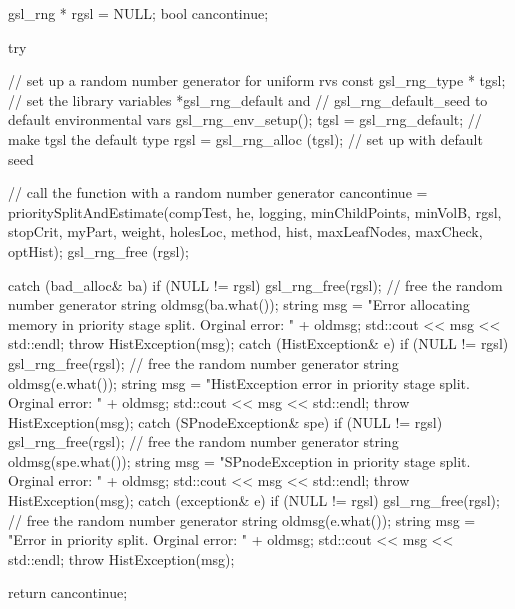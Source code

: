 \begin{DoxyCode}
{
    gsl_rng * rgsl = NULL;
    bool cancontinue;

    try {
        // set up a random number generator for uniform rvs
        const gsl_rng_type * tgsl;
        // set the library variables *gsl_rng_default and
        // gsl_rng_default_seed to default environmental vars
        gsl_rng_env_setup();
        tgsl = gsl_rng_default; // make tgsl the default type
        rgsl = gsl_rng_alloc (tgsl); // set up with default seed

        // call the function with a random number generator
        cancontinue = prioritySplitAndEstimate(compTest, he, logging, 
      minChildPoints, 
                        minVolB, rgsl, stopCrit, myPart, weight, holesLoc,
                        method, hist,
                        maxLeafNodes, maxCheck, optHist);
        gsl_rng_free (rgsl);
    }

    catch (bad_alloc& ba) {
        if (NULL != rgsl) gsl_rng_free(rgsl); // free the random number
       generator
        string oldmsg(ba.what());
        string msg = "Error allocating memory in priority stage split.  Orginal
       error: "
                                     + oldmsg;
        std::cout << msg << std::endl;
        throw HistException(msg);
    }
    catch (HistException& e) {
        if (NULL != rgsl) gsl_rng_free(rgsl); // free the random number
       generator
        string oldmsg(e.what());
        string msg = "HistException error in priority stage split.  Orginal
       error: "
                                    + oldmsg;
        std::cout << msg << std::endl;
        throw HistException(msg);
    }
    catch (SPnodeException& spe) {
        if (NULL != rgsl) gsl_rng_free(rgsl); // free the random number
       generator
        string oldmsg(spe.what());
        string msg = "SPnodeException in priority stage split.  Orginal error: 
      "
                                    + oldmsg;
        std::cout << msg << std::endl;
        throw HistException(msg);
    }
    catch (exception& e) {
        if (NULL != rgsl) gsl_rng_free(rgsl); // free the random number
       generator
        string oldmsg(e.what());
        string msg = "Error in priority split.  Orginal error: " + oldmsg;
        std::cout << msg << std::endl;
        throw HistException(msg);
    }
   
   return cancontinue;
}
\end{DoxyCode}
